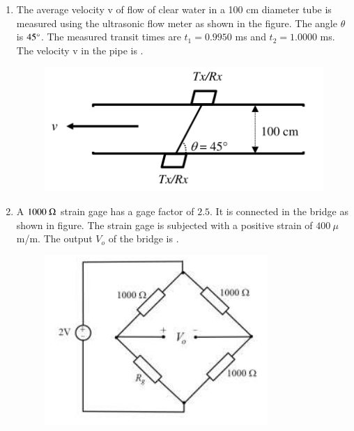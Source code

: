 \documentclass[journal,12pt,onecolumn]{IEEEtran}
\theoremstyle{remark}
\begin{document}
\begin{enumerate}
    \item The average velocity v of flow of clear water in a 100 cm  diameter tube is measured using the ultrasonic flow meter as shown in the figure. The angle $\theta$ is $45\degree$. The measured transit times are $t_1 = 0.9950$ ms and $t_2 = 1.0000$ ms. The velocity v  in the pipe is  \underline{\hspace{2cm}}.
    \begin{figure}[H]
        \centering
        \includegraphics[width=0.6\columnwidth]{q50.png}
        \caption*{}
        \label{fig:q50}
    \end{figure}
    
    \hfill{}
    
    \item A $1000~\ohm$ strain gage  has a gage factor of $2.5$. It is connected in the bridge as shown in figure. The strain gage is subjected with a positive strain of $400~\mu$m/m. The output $V_o$  of the bridge is  \underline{\hspace{2cm}}.
    \begin{figure}[H]
        \centering
        \includegraphics[width=0.8\columnwidth]{q51.png}
        \caption*{}
        \label{fig:q51}
    \end{figure}
    

\end{enumerate}
\end{document}
